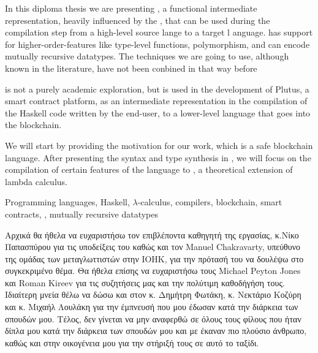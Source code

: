\documentclass[diploma]{softlab-thesis}
\begin{document}
																																			
\begin{abstracten}%

In this diploma thesis we are presenting \FIR{} , a functional intermediate representation, heavily influenced 
by the \FOM{}, that can be used during the compilation step from a high-level source lange to a target l
anguage. \FIR{} has support for higher-order-features like type-level functions, polymorphism, and can encode
mutually recursive datatypes. The techniques we are going to use, although known in the literature, have 
not been conbined in that way before

\FIR{} is not a purely academic exploration, but is used in the development of Plutus, a smart contract
platform, as an intermediate representation in the compilation of the Haskell code written by the end-user,
to a lower-level language that goes into the blockchain. 

We will start by providing the motivation for our work, which is a safe blockchain language. After presenting the syntax and type synthesis in \FIR{}, we will focus on the compilation of certain features
of the language to \FOMF, a theoretical extension of lambda calculus.
  
\begin{keywordsen}
Programming languages, Haskell, $\lambda$-calculus, compilers, blockchain, smart contracts, \FOM{},
mutually recursive datatypes
\end{keywordsen}
\end{abstracten}


\begin{acknowledgementsgr}


Αρχικά θα ήθελα να ευχαριστήσω τον επιβλέποντα καθηγητή της εργασίας, κ.Νίκο Παπασπύρου για τις υποδείξεις του καθώς και τον Manuel Chakravarty, υπεύθυνο της ομάδας των μεταγλωττιστών στην IOHK, για την πρότασή του να δουλέψω στο συγκεκριμένο θέμα. Θα ήθελα επίσης να ευχαριστήσω τους Michael Peyton Jones και Roman Kireev για τις συζητήσεις μας και την πολύτιμη καθοδήγήση τους. Ιδιαίτερη μνεία 
θέλω να δώσω και στον κ. Δημήτρη Φωτάκη, κ. Νεκτάριο Κοζύρη και κ. Μιχαήλ Λουλάκη για την έμπνευσή
που μου έδωσαν κατά την διάρκεια των σπουδών μου.
Τέλος, δεν γίνεται να μην αναφερθώ σε όλους τους φίλους που ήταν δίπλα μου κατά την διάρκεια των σπουδών μου και με έκαναν πιο πλούσιο άνθρωπο, καθώς και στην οικογένεια μου για την στήριξή τους σε αυτό το ταξίδι.

\end{acknowledgementsgr}
\end{document}

